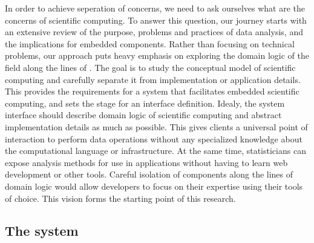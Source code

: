 In order to achieve seperation of concerns, we need to ask ourselves what are the concerns of scientific computing. To answer this question, our journey starts with an extensive review of the purpose, problems and practices of data analysis, and the implications for embedded components. Rather than focusing on technical problems, our approach puts heavy emphasis on exploring the domain logic of the field along the lines of \citep{evans2004domain}. The goal is to study the conceptual model of scientific computing and carefully separate it from implementation or application details. This provides the requirements for a system that facilitates embedded scientific computing, and sets the stage for an interface definition. Idealy, the system interface should describe domain logic of scientific computing and abstract implementation details as much as possible. This gives clients a universal point of interaction to perform data operations without any specialized knowledge about the computational language or infrastructure. At the same time, statisticians can expose analysis methods for use in applications without having to learn web development or other tools. Careful isolation of components along the lines of domain logic would allow developers to focus on their expertise using their tools of choice. This vision forms the starting point of this research. 





\subsection{The \OpenCPU system}


